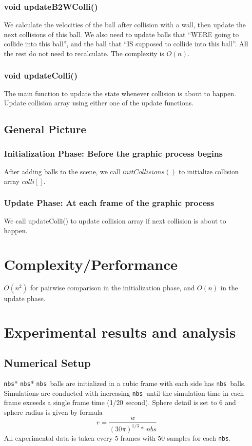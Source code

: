 \documentclass[twoside,11pt]{article}
\newcommand{\nbs}{\texttt{nbs}}
\begin{document}
\subsubsection{void updateB2WColli()}
We calculate the velocities of the ball after collision with a wall, then update the next collisions of this ball. We also need to update balls that ``WERE going to collide into this ball'', and the ball that ``IS supposed to collide into this ball''. All the rest do not need to recalculate. The complexity is $O(n)$.

\subsubsection{void updateColli()}
The main function to update the state whenever collision is about to happen. Update collision array using either one of the update functions.

\subsection{General Picture}

\subsubsection{Initialization Phase: Before the graphic process begins}
After adding balls to the scene, we call $initCollisions()$ to initialize collision array $colli[]$.


\subsubsection{Update Phase: At each frame of the graphic process}
We call updateColli() to update collision array if next collision is about to happen.


\section{Complexity/Performance}
$O(n^2)$ for pairwise comparison in the initialization phase, and $O(n)$ in the update phase.


\section{Experimental results and analysis}

\subsection{Numerical Setup}
\nbs * \nbs * \nbs\ balls are initialized in a cubic 
frame with each side has \nbs\ balls. Simulations are conducted 
with increasing \nbs\ until the simulation time in each frame exceeds
a single frame time (1/20 second). Sphere detail is set to 6 and 
sphere radius is given by formula
\[
  r = \frac{w}{(30\pi)^{1/3} *\, nbs}
\] 
All experimental data is taken every 5 frames with 50 samples
for each \nbs.
\end{document}
